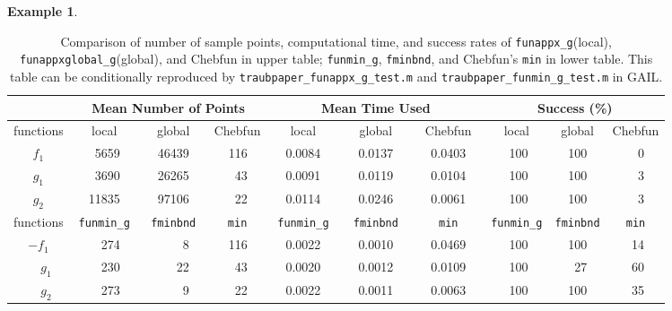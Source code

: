 \documentclass[review]{elsarticle}
\theoremstyle{definition}
\newtheorem{exmp}{Example}
\newcommand{\funappxg}{\texttt{funappx\_g}\xspace}
\newcommand{\funappxglobalg}{\texttt{funappxglobal\_g}\xspace}
\newcommand{\funming}{\texttt{funmin\_g}\xspace}
\newcommand{\fminbnd}{\texttt{fminbnd}\xspace}
\begin{document}
\begin{exmp}
%

%
\begin{table}[bt]
\centering
\caption{Comparison of number of sample points, computational time,  and success
rates of \funappxg (local), \funappxglobalg (global), and Chebfun in upper table;
\funming, \fminbnd, and Chebfun's \texttt{min} in lower table.
This table can be conditionally reproduced by
\texttt{traubpaper\_funappx\_g\_test.m} and \texttt{traubpaper\_funmin\_g\_test.m}  in GAIL.}
\label{tab:localVsGlobalVsChebfun}
{\footnotesize
\setlength{\tabcolsep}{.15 em} %
		\begin{tabular}{ccrccrccrccrccrccrccrccrccrc}	
		 \hline	
			               &    \multicolumn{9}{c}{\bf Mean Number of Points}   & \multicolumn{9}{c}{\bf Mean Time Used}  & \multicolumn{9}{c}{\bf Success (\%)}
	  \\ \hline  functions &  \multicolumn{3}{c}{local}  &  \multicolumn{3}{c}{global }  &  \multicolumn{3}{c}{Chebfun }  & \multicolumn{3}{c}{local}  &  \multicolumn{3}{c}{global }  &  \multicolumn{3}{c}{Chebfun } & \multicolumn{3}{c}{local}  &  \multicolumn{3}{c}{global }  &  \multicolumn{3}{c}{Chebfun }
\\ \toprule
          $f_1$   &&    5659  &&&    46439  &&&   116    &&&   0.0084   &&&     0.0137    &&&   0.0403 &&&    100   &&&  100   &&&  0
\\        $g_1$   &&    3690  &&&    26265  &&&    43    &&&   0.0091   &&&     0.0119    &&&   0.0104 &&&    100   &&&  100   &&&  3
\\        $g_2$   &&   11835  &&&    97106  &&&    22    &&&   0.0114   &&&     0.0246    &&&   0.0061 &&&    100   &&&  100    &&&  3  	
\\ \hline

			 functions &  \multicolumn{3}{c}{\funming} &  \multicolumn{3}{c}{\fminbnd}  &  \multicolumn{3}{c}{\texttt{min}}
		  &  \multicolumn{3}{c}{\funming}  &  \multicolumn{3}{c}{\fminbnd }  &  \multicolumn{3}{c}{\texttt{min} }  &  \multicolumn{3}{c}{\funming} & \multicolumn{3}{c}{\fminbnd} & \multicolumn{3}{c}{\texttt{min}}
			\\ \toprule
			$-f_1$   &&  274   &&&   8   &&&  116     &&&   0.0022   &&&   0.0010    &&& 0.0469  &&&   100   &&&  100   &&&  14
			\\ $\phantom{-}g_1$   && 230 &&&  22   &&&    43    &&& 0.0020  &&&    0.0012   &&&  0.0109 &&&    100   &&&   27   &&&  60
			\\ $\phantom{-}g_2$   &&  273 &&&   9   &&&   22    &&&  0.0022   &&&   0.0011    &&&  0.0063 &&&    100   &&& 100   &&&  35
			\\ \hline
		\end{tabular}
}
\end{table}
%


\end{exmp}
\end{document}
